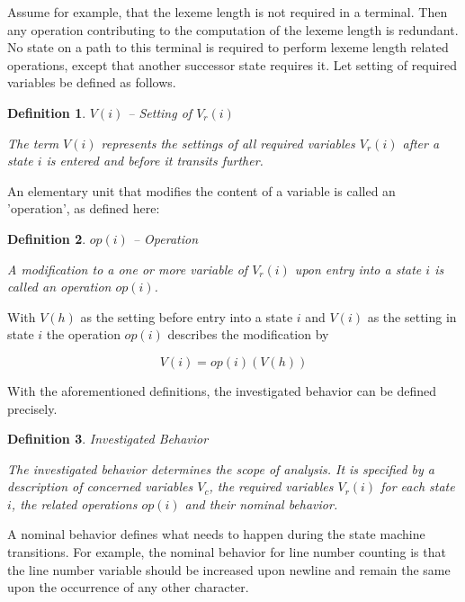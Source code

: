 \documentclass[12pt,a4paper]{scrartcl}
\newtheorem{definition}{Definition}
\begin{document}
Assume for example, that the lexeme length is not required in a terminal. Then
any operation contributing to the computation of the lexeme length is
redundant.  No state on a path to this terminal is required to perform lexeme
length related operations, except that another successor state requires it.
Let setting of required variables be defined as follows.

\begin{definition}
$V(i)$ -- Setting of $V_r(i)$

The term $V(i)$ represents the settings of all required variables $V_r(i)$
after a state $i$ is entered and before it transits further. 
\end{definition}
    
An elementary unit that modifies the content of a variable is called an
'operation', as defined here:

\begin{definition}
$op(i)$ -- Operation 

A modification to a one or more variable of $V_r(i)$ upon entry into a state
$i$ is called an operation $op(i)$. 
\end{definition}
    
With $V(h)$ as the setting before entry into a state $i$ and $V(i)$ as the
setting in state $i$ the operation $op(i)$ describes the modification by 

\begin{equation}
\label{eq:operation}
                         V(i) = op(i)(V(h))
\end{equation}

With the aforementioned definitions, the investigated behavior can be defined
precisely.

\begin{definition}
Investigated Behavior 

The investigated behavior determines the scope of analysis. It is
specified by a description of concerned variables $V_c$, the required
variables $V_r(i)$ for each state $i$, the related operations $op(i)$ and
their nominal behavior.
\end{definition}
    
A nominal behavior defines what needs to happen during the state machine
transitions.  For example, the nominal behavior for line number counting is
that the line number variable should be increased upon newline and remain the
same upon the occurrence of any other character. 

%
\end{document}
